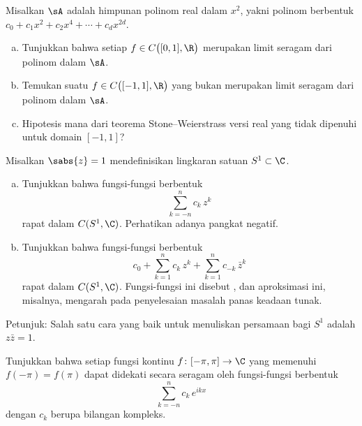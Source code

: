 \begin{exercise}
Misalkan $\sA$ adalah himpunan polinom real dalam $x^2$,
yakni polinom berbentuk
$c_0 + c_1 x^2 + c_2 x^4 + \cdots + c_d x^{2d}$.
\begin{enumerate}[a)]
\item
Tunjukkan bahwa setiap $f \in C\bigl([0,1],\R\bigr)$ merupakan limit seragam
dari polinom dalam $\sA$.
\item
Temukan suatu $f \in  C\bigl([-1,1],\R\bigr)$ yang bukan merupakan
limit seragam dari polinom dalam $\sA$.
\item
Hipotesis mana dari teorema Stone--Weierstrass versi real yang tidak dipenuhi
untuk domain $[-1,1]$?
\end{enumerate}
\end{exercise}

\begin{exercise}
\pagebreak[3]
Misalkan $\sabs{z}=1$ mendefinisikan lingkaran satuan $S^1 \subset \C$.
\begin{enumerate}[a)]
\item
Tunjukkan bahwa fungsi-fungsi berbentuk
\begin{equation*}
\sum_{k=-n}^n c_k\, z^k
\end{equation*}
rapat dalam $C(S^1,\C)$.  Perhatikan adanya pangkat negatif.
\item 
Tunjukkan bahwa fungsi-fungsi berbentuk
\begin{equation*}
c_0
+
\sum_{k=1}^n c_k \, z^k
+
\sum_{k=1}^n c_{-k}\, \bar{z}^k
\end{equation*}
rapat dalam $C(S^1,\C)$.
Fungsi-fungsi ini disebut \emph{},
dan aproksimasi ini, misalnya, mengarah pada penyelesaian
masalah panas keadaan tunak.
\end{enumerate}
Petunjuk: Salah satu cara yang baik untuk menuliskan persamaan bagi $S^1$
adalah $z \bar{z} = 1$.
\end{exercise}

\begin{exercise} \label{exercise:trigpolydense}
Tunjukkan bahwa setiap fungsi kontinu $f \colon [-\pi,\pi] \to \C$
yang memenuhi $f(-\pi)=f(\pi)$ dapat didekati secara seragam oleh
fungsi-fungsi berbentuk
\begin{equation*}
\sum_{k=-n}^n c_k \, e^{ik x}
\end{equation*}
dengan $c_k$ berupa bilangan kompleks.
\end{exercise}


